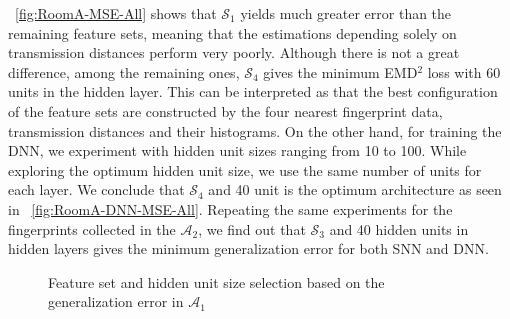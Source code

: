 \documentclass[conference]{IEEEtran}
\begin{document}
{	\figurename~\ref{fig:RoomA-MSE-All} shows that $\mathcal{S}_1$ yields much greater error than the remaining feature sets, meaning that the estimations depending solely on transmission distances perform very poorly. Although there is not a great difference, among the remaining ones, $\mathcal{S}_4$ gives the minimum EMD$^2$ loss with 60 units in the hidden layer. This can be interpreted as that the best configuration of the feature sets are constructed by the four nearest fingerprint data, transmission distances and their histograms. On the other hand, for training the DNN, we experiment with hidden unit sizes ranging from 10 to 100. While exploring the optimum hidden unit size, we use the same number of units for each layer. We conclude that $\mathcal{S}_4$ and 40 unit is the optimum architecture as seen in \figurename~\ref{fig:RoomA-DNN-MSE-All}. Repeating the same experiments for the fingerprints collected in the $\mathcal{A}_2$, we find out that $\mathcal{S}_3$ and 40 hidden units in hidden layers gives the minimum generalization error for both SNN and DNN. 
	\begin{figure}[h]
		\centering
		\caption{Feature set and hidden unit size selection based on the generalization error in $\mathcal{A}_1$}
	\end{figure}
	
}
\end{document}
